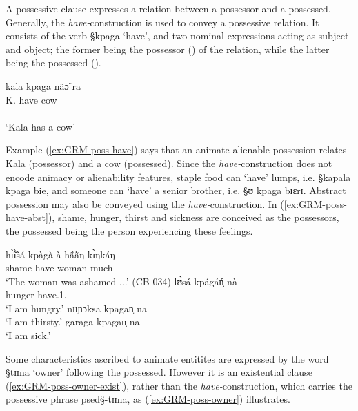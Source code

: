 A possessive clause expresses a relation between  a
possessor and a possessed.  Generally,  the  {\it
have-}construction  is used to convey a possessive relation. It consists of
the verb {\S kpaga} `have',  and two nominal expressions acting as subject and
object; the former being the possessor (\psor) of the relation, while  the
latter being  the possessed
(\psed).

\begin{exe}
\ex\label{ex:GRM-poss-have}
\glll kala kpaga nãɔ̃ ra\\
K. have cow {\foc}\\
  {\psor} {}   {\psed} {} \\
\glt  `Kala has a cow'
\end{exe}

Example (\ref{ex:GRM-poss-have}) says that an animate alienable possession
relates  Kala (possessor) and a cow (possessed).  Since the  {\it
have-}construction does not encode animacy or alienability features,   staple
food can `have' lumps, i.e. {\S kapala kpaga bie}, and someone can `have' a
senior brother, i.e. {\S ʊ kpaga bɪɛrɪ}.  Abstract possession may also be
conveyed using the {\it have-}construction. In (\ref{ex:GRM-poss-have-abst}),
  shame, hunger,  thirst and sickness are conceived as the possessors, the
possessed being the person experiencing these feelings. 



\begin{exe}
\ex\label{ex:GRM-poss-have-abst}
\begin{xlist}
 \ex\label{ex:GRM-poss-have-abst-1}
\gll hɪ̃̀ɪ̃̀sá kpàgà 	à   hã́ã̀ŋ    kɪ̀ŋkáŋ   \\
shame     	have  	{\art} 	woman    much\\
\glt `The woman was ashamed ...' (CB 034)
\ex\label{ex:GRM-poss-have-abst-2}
\gll lʊ̀sá kpágáń̩ nà\\
hunger have.{1.\sg} {\foc}\\
`I am hungry.'
\ex\label{ex:GRM-poss-have-abst-3}
nɪɪɲɔksa kpagan̩ na \\
`I am thirsty.'
\ex\label{ex:GRM-poss-have-abst-4}
garaga kpagan̩ na \\
`I am sick.'
\end{xlist}
\end{exe}

Some characteristics ascribed to animate entitites are expressed by  the
word {\S tɪɪna} `owner' following the possessed.  However it
is an existential clause (\ref{ex:GRM-poss-owner-exist}), rather than the  {\it
have-}construction, which carries the
possessive phrase {\sc psed}{\S -tɪɪna}, as (\ref{ex:GRM-poss-owner})
illustrates.



